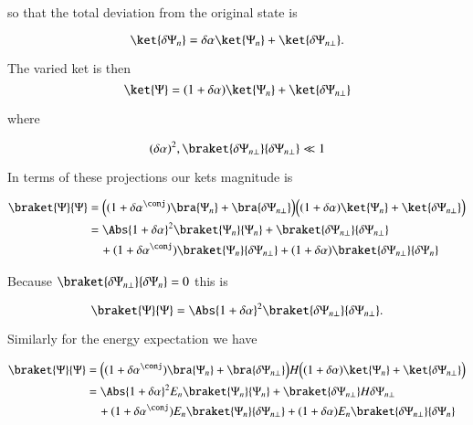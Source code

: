 so that the total deviation from the original state is

\begin{equation}\label{eqn:qmTwoL3:50}
\ket{\delta \Psi_n} 
= \delta \alpha \ket{\Psi_n} 
+ \ket{\delta \Psi_{n \perp}} .
\end{equation}

The varied ket is then
\begin{equation}\label{eqn:qmTwoL3:70}
\ket{\Psi} 
= (1 + \delta \alpha )\ket{\Psi_n} + \ket{\delta \Psi_{n \perp}} 
\end{equation}

where

\begin{equation}\label{eqn:qmTwoL3:90}
(\delta \alpha)^2, \braket{\delta \Psi_{n \perp}}{\delta \Psi_{n \perp}}  \ll 1
\end{equation}

In terms of these projections our kets magnitude is

\begin{align*}
\braket{\Psi}{\Psi} 
&= 
\Bigl(
(1 + {\delta \alpha}^\conj )\bra{\Psi_n} + \bra{\delta \Psi_{n \perp}} 
\Bigr)
\Bigl(
(1 + \delta \alpha )\ket{\Psi_n} + \ket{\delta \Psi_{n \perp}} 
\Bigr) \\
&=
\Abs{1 + \delta \alpha}^2 \braket{\Psi_n}{\Psi_n}
+ 
\braket{\delta \Psi_{n \perp}}{\delta \Psi_{n \perp}}  \\
&\quad +
(1 + {\delta \alpha}^\conj )\braket{\Psi_n}{\delta \Psi_{n \perp}} 
+
(1 + \delta \alpha )\braket{\delta \Psi_{n \perp}}{\delta \Psi_n} 
\end{align*}

Because $\braket{\delta \Psi_{n \perp}}{\delta \Psi_n} = 0$ this is

\begin{equation}\label{eqn:qmTwoL3:110}
\braket{\Psi}{\Psi}
= 
\Abs{1 + \delta \alpha }^2
\braket{\delta \Psi_{n \perp}}{\delta \Psi_{n \perp}}.
\end{equation}

Similarly for the energy expectation we have

\begin{align*}
\braket{\Psi}{\Psi} 
&= 
\Bigl(
(1 + {\delta \alpha}^\conj )\bra{\Psi_n} + \bra{\delta \Psi_{n \perp}} 
\Bigr)
H
\Bigl(
(1 + \delta \alpha )\ket{\Psi_n} + \ket{\delta \Psi_{n \perp}} 
\Bigr) \\
&=
\Abs{1 + \delta \alpha}^2 E_n \braket{\Psi_n}{\Psi_n}
+ 
\braket{\delta \Psi_{n \perp}} H {\delta \Psi_{n \perp}}  \\
&\quad + 
(1 + {\delta \alpha}^\conj ) E_n \braket{\Psi_n}{\delta \Psi_{n \perp}} 
+
(1 + \delta \alpha ) E_n \braket{\delta \Psi_{n \perp}}{\delta \Psi_n} 
\end{align*}

